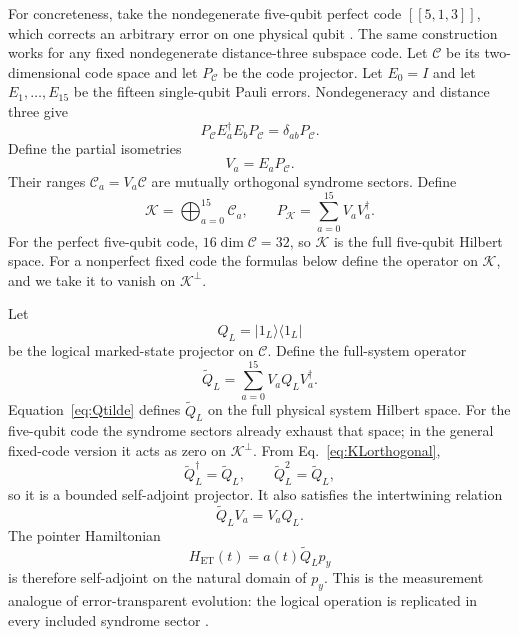 \documentclass[pdflatex,sn-mathphys-num]{sn-jnl}
\theoremstyle{thmstyleone}
\begin{document}
For concreteness, take the nondegenerate five-qubit perfect code $[[5,1,3]]$, which corrects an arbitrary error on one physical qubit \cite{Laflamme1996}. The same construction works for any fixed nondegenerate distance-three subspace code. Let $\mathcal C$ be its two-dimensional code space and let $P_{\mathcal C}$ be the code projector. Let $E_0=I$ and let $E_1,\ldots,E_{15}$ be the fifteen single-qubit Pauli errors. Nondegeneracy and distance three give
\begin{equation}
P_{\mathcal C}E_a^\dagger E_bP_{\mathcal C}
=\delta_{ab}P_{\mathcal C}.
\label{eq:KLorthogonal}
\end{equation}
Define the partial isometries
\begin{equation}
V_a=E_aP_{\mathcal C}.
\end{equation}
Their ranges $\mathcal C_a=V_a\mathcal C$ are mutually orthogonal syndrome sectors. Define
\begin{equation}
\mathcal K=\bigoplus_{a=0}^{15}\mathcal C_a,
\qquad
P_{\mathcal K}=\sum_{a=0}^{15}V_aV_a^\dagger.
\end{equation}
For the perfect five-qubit code, $16\dim\mathcal C=32$, so $\mathcal K$ is the full five-qubit Hilbert space. For a nonperfect fixed code the formulas below define the operator on $\mathcal K$, and we take it to vanish on $\mathcal K^\perp$.

Let
\begin{equation}
Q_L=|1_L\rangle\langle1_L|
\end{equation}
be the logical marked-state projector on $\mathcal C$. Define the full-system operator
\begin{equation}
\widetilde Q_L
=\sum_{a=0}^{15} V_aQ_LV_a^\dagger.
\label{eq:Qtilde}
\end{equation}
Equation~\eqref{eq:Qtilde} defines $\widetilde Q_L$ on the full physical system Hilbert space. For the five-qubit code the syndrome sectors already exhaust that space; in the general fixed-code version it acts as zero on $\mathcal K^\perp$. From Eq.~\eqref{eq:KLorthogonal},
\begin{equation}
\widetilde Q_L^\dagger=\widetilde Q_L,
\qquad
\widetilde Q_L^2=\widetilde Q_L,
\end{equation}
so it is a bounded self-adjoint projector. It also satisfies the intertwining relation
\begin{equation}
\widetilde Q_LV_a=V_aQ_L.
\label{eq:intertwine}
\end{equation}
The pointer Hamiltonian
\begin{equation}
H_{\mathrm{ET}}(t)=a(t)\widetilde Q_Lp_y
\label{eq:ETH}
\end{equation}
is therefore self-adjoint on the natural domain of $p_y$. This is the measurement analogue of error-transparent evolution: the logical operation is replicated in every included syndrome sector \cite{VyWangJacobs2013}.
\end{document}
